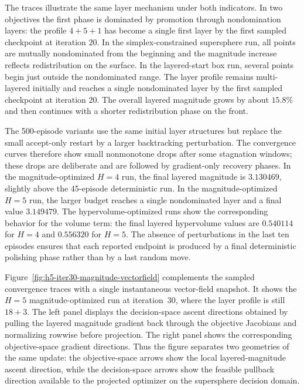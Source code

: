 \documentclass{article}
\begin{document}
The traces illustrate the same layer mechanism under both indicators.  In two objectives the first phase is dominated by promotion through nondomination layers: the profile $4+5+1$ has become a single first layer by the first sampled checkpoint at iteration $20$.  In the simplex-constrained supersphere run, all points are mutually nondominated from the beginning and the magnitude increase reflects redistribution on the surface.  In the layered-start box run, several points begin just outside the nondominated range.  The layer profile remains multi-layered initially and reaches a single nondominated layer by the first sampled checkpoint at iteration $20$.  The overall layered magnitude grows by about $15.8\%$ and then continues with a shorter redistribution phase on the front.

The 500-episode variants use the same initial layer structures but replace the small accept-only restart by a larger backtracking perturbation.  The convergence curves therefore show small nonmonotone drops after some stagnation windows; these drops are deliberate and are followed by gradient-only recovery phases.  In the magnitude-optimized $H=4$ run, the final layered magnitude is $3.130469$, slightly above the 45-episode deterministic run.  In the magnitude-optimized $H=5$ run, the larger budget reaches a single nondominated layer and a final value $3.149479$.  The hypervolume-optimized runs show the corresponding behavior for the volume term: the final layered hypervolume values are $0.540114$ for $H=4$ and $0.556320$ for $H=5$.  The absence of perturbations in the last ten episodes ensures that each reported endpoint is produced by a final deterministic polishing phase rather than by a last random move.


Figure~\ref{fig:h5-iter30-magnitude-vectorfield} complements the sampled convergence traces with a single instantaneous vector-field snapshot. It shows the $H=5$ magnitude-optimized run at iteration~30, where the layer profile is still $18+3$. The left panel displays the decision-space ascent directions obtained by pulling the layered magnitude gradient back through the objective Jacobians and normalizing rowwise before projection. The right panel shows the corresponding objective-space gradient directions. Thus the figure separates two geometries of the same update: the objective-space arrows show the local layered-magnitude ascent direction, while the decision-space arrows show the feasible pullback direction available to the projected optimizer on the supersphere decision domain.
\end{document}
